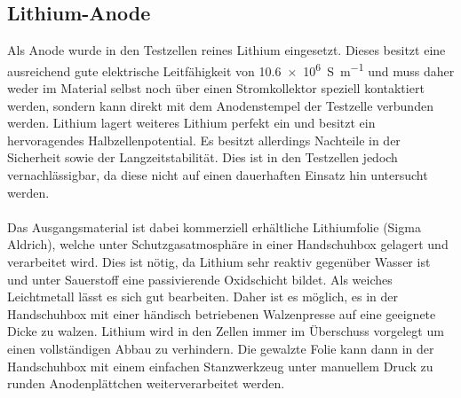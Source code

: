 \documentclass[a4paper, 11pt, headsepline,footsepline,twoside,abstract]{scrbook}
\begin{document}
\subsection{Lithium-Anode}
Als Anode wurde in den Testzellen reines Lithium eingesetzt. Dieses besitzt eine ausreichend gute elektrische Leitfähigkeit von \SI{10.6e6}{\siemens\per\meter} \cite{binder1999lexikon} und muss daher weder im Material selbst noch über einen Stromkollektor speziell kontaktiert werden, sondern kann direkt mit dem Anodenstempel der Testzelle verbunden werden. Lithium lagert weiteres Lithium perfekt ein und besitzt ein hervoragendes Halbzellenpotential. Es besitzt allerdings Nachteile in der Sicherheit sowie der Langzeitstabilität. Dies ist in den Testzellen jedoch vernachlässigbar, da diese nicht auf einen dauerhaften Einsatz hin untersucht werden.
\\\\
Das Ausgangsmaterial ist dabei kommerziell erhältliche Lithiumfolie (Sigma Aldrich), welche unter Schutzgasatmosphäre in einer Handschuhbox gelagert und verarbeitet wird. Dies ist nötig, da Lithium sehr reaktiv gegenüber Wasser ist und unter Sauerstoff eine passivierende Oxidschicht bildet. Als weiches Leichtmetall lässt es sich gut bearbeiten. Daher ist es möglich, es in der Handschuhbox mit einer händisch betriebenen Walzenpresse auf eine geeignete Dicke zu walzen. Lithium wird in den Zellen immer im Überschuss vorgelegt um einen vollständigen Abbau zu verhindern. Die gewalzte Folie kann dann in der Handschuhbox mit einem einfachen Stanzwerkzeug unter manuellem Druck zu runden Anodenplättchen weiterverarbeitet werden.
\end{document}
